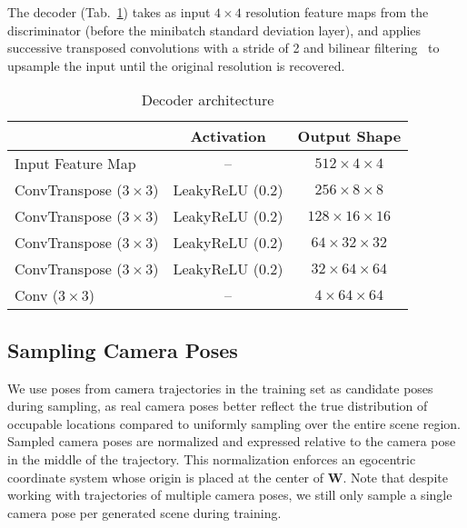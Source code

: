 \documentclass[10pt,twocolumn,letterpaper]{article}
\begin{document}
The decoder (Tab.~\ref{tab:decoder_architecture}) takes as input $4\times4$ resolution feature maps from the discriminator (before the minibatch standard deviation layer), and applies successive transposed convolutions with a stride of 2 and bilinear filtering~\cite{blur} to upsample the input until the original resolution is recovered.

\begin{table}[h]
	\small
	\centering
	\begin{tabular}{lcc}
		\toprule
		& Activation & Output Shape \\
		\midrule
		Input Feature Map & -- & $512 \times 4 \times 4$ \\
		ConvTranspose ($3\times3$) & LeakyReLU (0.2) & $256\times 8 \times 8$ \\
		ConvTranspose ($3\times3$) & LeakyReLU (0.2) & $128\times 16 \times 16$ \\
		ConvTranspose ($3\times3$) & LeakyReLU (0.2) & $64\times 32 \times 32$ \\
		ConvTranspose ($3\times3$) & LeakyReLU (0.2) & $32\times 64 \times 64$ \\
		Conv ($3\times3$) & -- & $4\times 64 \times 64$ \\
		\bottomrule
	\end{tabular}
	\caption{Decoder architecture}
	\label{tab:decoder_architecture}
\end{table}

\subsection{Sampling Camera Poses}
We use poses from  camera trajectories in the training set as candidate poses during sampling, as real camera poses better reflect the true distribution of occupable locations compared to uniformly sampling over the entire scene region. Sampled camera poses are normalized and expressed relative to the camera pose in the middle of the trajectory. This normalization enforces an egocentric coordinate system whose origin is placed at the center of $\textbf{W}$. Note that despite working with trajectories of multiple camera poses, we still only sample a single camera pose per generated scene during training.
\end{document}
